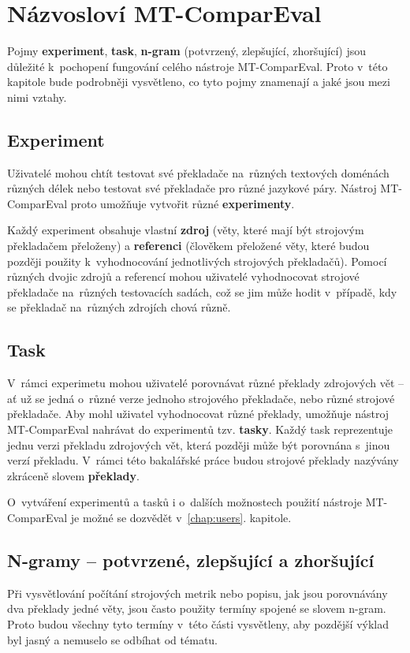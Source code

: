 \chapter{Názvosloví \mbox{MT-ComparEval}}
\label{chap:experiments}

Pojmy \textbf{experiment}, \textbf{task}, \textbf{\mbox{n-gram}} (potvrzený, zlepšující, zhoršující) jsou důležité k~pochopení fungování celého nástroje \mbox{MT-ComparEval}.
Proto v~této kapitole bude podrobněji vysvětleno,
  co tyto pojmy znamenají a jaké jsou mezi nimi vztahy.

\section{Experiment}
Uživatelé mohou chtít testovat své překladače na~různých textových doménách různých délek
  nebo testovat své překladače pro různé jazykové páry.
Nástroj \mbox{MT-ComparEval} proto umožňuje vytvořit různé \textbf{experimenty}.

Každý experiment obsahuje vlastní \textbf{zdroj} (věty, které mají být strojovým překladačem přeloženy) a
  \textbf{referenci} (člověkem přeložené věty, které budou později použity k~vyhodnocování jednotlivých strojových překladačů).
Pomocí různých dvojic zdrojů a referencí mohou uživatelé vyhodnocovat strojové překladače na~různých testovacích sadách,
  což se jim může hodit v~případě,
  kdy se překladač na~různých zdrojích chová různě.

\section{Task}
V~rámci experimetu mohou uživatelé porovnávat různé překlady zdrojových vět --
  ať už se jedná o~různé verze jednoho strojového překladače, nebo různé strojové překladače.
Aby mohl uživatel vyhodnocovat různé překlady,
  umožňuje nástroj \mbox{MT-ComparEval} nahrávat do experimentů tzv. \textbf{tasky}.
Každý task reprezentuje jednu verzi překladu zdrojových vět,
  která později může být porovnána s~jinou verzí překladu.
V~rámci této bakalářské práce budou strojové překlady nazývány zkráceně slovem \textbf{překlady}.

O~vytváření experimentů a tasků i o~dalších možnostech použití nástroje \mbox{MT-ComparEval} je možné se dozvědět v~\ref{chap:users}. kapitole.

\section{N-gramy -- potvrzené, zlepšující a zhoršující}
Při vysvětlování počítání strojových metrik
  nebo popisu, jak jsou porovnávány dva překlady jedné věty,
  jsou často použity termíny spojené se slovem \mbox{n-gram}.
Proto budou všechny tyto termíny v~této části vysvětleny,
  aby pozdější výklad byl jasný a nemuselo se odbíhat od tématu.

